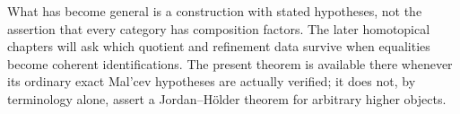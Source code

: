 What has become general is a construction with stated hypotheses, not
the assertion that every category has composition factors.  The later
homotopical chapters will ask which quotient and refinement data survive
when equalities become coherent identifications.  The present theorem
is available there whenever its ordinary exact Mal'cev hypotheses are
actually verified; it does not, by terminology alone, assert a
Jordan--H\"older theorem for arbitrary higher objects.
